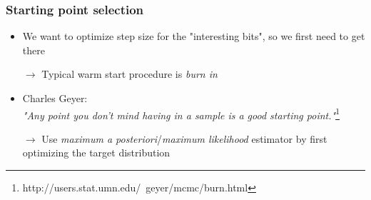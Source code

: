 \begin{frame}[c]
    \frametitle{Starting point selection}
    \begin{itemize}
        \item We want to optimize step size for the "interesting bits", so we first need to get there
        \item[$\to$] Typical warm start procedure is \emph{burn in}
        \item[]
        \item Charles Geyer: \\
            {\centering
            \emph{"Any point you don't mind having in a sample is a good starting point."}\footnote{http://users.stat.umn.edu/~geyer/mcmc/burn.html}
        } \\[1mm]
        \item[$\to$] Use \emph{maximum a posteriori}/\emph{maximum likelihood} estimator by first optimizing the target distribution
    \end{itemize}
    \centering
\end{frame}

